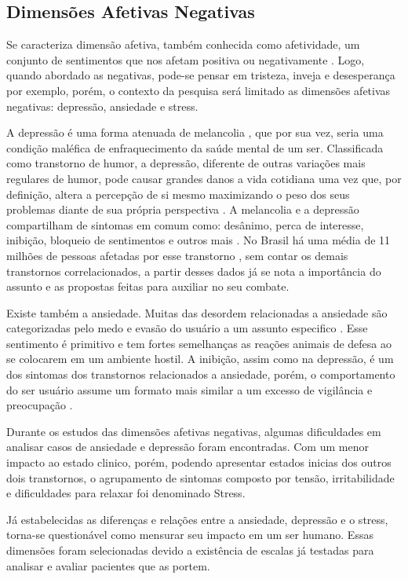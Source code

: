\subsection{Dimensões Afetivas Negativas}
Se caracteriza dimensão afetiva, também conhecida como afetividade, um conjunto de sentimentos que nos afetam positiva ou negativamente \cite[2-6]{pinto2009afetos}. Logo, quando abordado as negativas, pode-se pensar em tristeza, inveja e desesperança por exemplo, porém, o contexto da pesquisa será limitado as dimensões afetivas negativas: depressão, ansiedade e stress.

A depressão é uma forma atenuada de melancolia \cite{roudinesco2000psicanalise}, que por sua vez, seria uma condição maléfica de enfraquecimento da saúde mental de um ser. Classificada como transtorno de humor, a depressão, diferente de outras variações mais regulares de humor, pode causar grandes danos a vida cotidiana uma vez que, por definição, altera a percepção de si mesmo maximizando o peso dos seus problemas diante de sua própria perspectiva \cite{esteves2006depressao}. A melancolia e a depressão compartilham de sintomas em comum como: desânimo, perca de interesse, inibição, bloqueio de sentimentos e outros mais \cite[28]{freud2014livro}. No Brasil há uma média de 11 milhões de pessoas afetadas por esse transtorno \cite{paho2017-letstalk}, sem contar os demais transtornos correlacionados, a partir desses dados já se nota a importância do assunto e as propostas feitas para auxiliar no seu combate.

Existe também a ansiedade. Muitas das desordem relacionadas a ansiedade são categorizadas pelo medo e evasão do usuário a um assunto especifico \cite[393]{dsmiv}. Esse sentimento é primitivo e tem fortes semelhanças as reações animais de defesa ao se colocarem em um ambiente hostil. A inibição, assim como na depressão, é um dos sintomas dos transtornos relacionados a ansiedade, porém, o comportamento do ser usuário assume um formato mais similar a um excesso de vigilância e preocupação \cite{margis2003relaccao}.

Durante os estudos das dimensões afetivas negativas, algumas dificuldades em analisar casos de ansiedade e depressão foram encontradas. Com um menor impacto ao estado clinico, porém, podendo apresentar estados inicias dos outros dois transtornos, o agrupamento de sintomas composto por tensão, irritabilidade e dificuldades para relaxar foi denominado Stress. \cite{lovibond1995structure, ribeiro2004contribuiccao, margis2003relaccao}

Já estabelecidas as diferenças e relações entre a ansiedade, depressão e o stress, torna-se questionável como mensurar seu impacto em um ser humano. Essas dimensões foram selecionadas devido a existência de escalas já testadas para analisar e avaliar pacientes que as portem.


